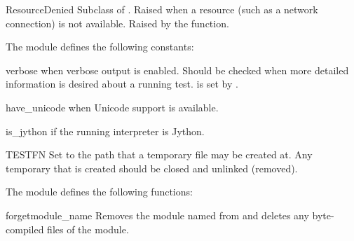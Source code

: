 \begin{excdesc}{ResourceDenied}
Subclass of .
Raised when a resource (such as a network connection) is not available.
Raised by the  function.
\end{excdesc}


The  module defines the following constants:

\begin{datadesc}{verbose}
 when verbose output is enabled.
Should be checked when more detailed information is desired about a running
test.
 is set by .
\end{datadesc}

\begin{datadesc}{have_unicode}
 when Unicode support is available.
\end{datadesc}

\begin{datadesc}{is_jython}
 if the running interpreter is Jython.
\end{datadesc}

\begin{datadesc}{TESTFN}
Set to the path that a temporary file may be created at.
Any temporary that is created should be closed and unlinked (removed).
\end{datadesc}


The  module defines the following functions:

\begin{funcdesc}{forget}{module_name}
Removes the module named  from  and deletes
any byte-compiled files of the module.
\end{funcdesc}


